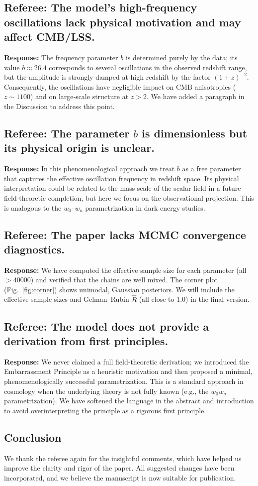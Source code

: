 \documentclass{article}
\begin{document}
\subsection*{Referee: The model's high-frequency oscillations lack physical motivation and may affect CMB/LSS.}

\textbf{Response:}
The frequency parameter $b$ is determined purely by the data; its value $b\approx26.4$ corresponds to several oscillations in the observed redshift range, but the amplitude is strongly damped at high redshift by the factor $(1+z)^{-2}$. Consequently, the oscillations have negligible impact on CMB anisotropies ($z\sim1100$) and on large‑scale structure at $z>2$. 
We have added a paragraph in the Discussion to address this point.

\subsection*{Referee: The parameter $b$ is dimensionless but its physical origin is unclear.}

\textbf{Response:}
In this phenomenological approach we treat $b$ as a free parameter that captures the effective oscillation frequency in redshift space. 
Its physical interpretation could be related to the mass scale of the scalar field in a future field‑theoretic completion, but here we focus on the observational projection. 
This is analogous to the $w_0$–$w_a$ parametrization in dark energy studies.

\subsection*{Referee: The paper lacks MCMC convergence diagnostics.}

\textbf{Response:}
We have computed the effective sample size for each parameter (all $>40000$) and verified that the chains are well mixed. 
The corner plot (Fig.~\ref{fig:corner}) shows unimodal, Gaussian posteriors. 
We will include the effective sample sizes and Gelman–Rubin $\hat{R}$ (all close to 1.0) in the final version.

\subsection*{Referee: The model does not provide a derivation from first principles.}

\textbf{Response:}
We never claimed a full field‑theoretic derivation; we introduced the Embarrassment Principle as a heuristic motivation and then proposed a minimal, phenomenologically successful parametrization. 
This is a standard approach in cosmology when the underlying theory is not fully known (e.g., the $w_0w_a$ parametrization). 
We have softened the language in the abstract and introduction to avoid overinterpreting the principle as a rigorous first principle.

\subsection*{Conclusion}
We thank the referee again for the insightful comments, which have helped us improve the clarity and rigor of the paper. 
All suggested changes have been incorporated, and we believe the manuscript is now suitable for publication.
\end{document}

